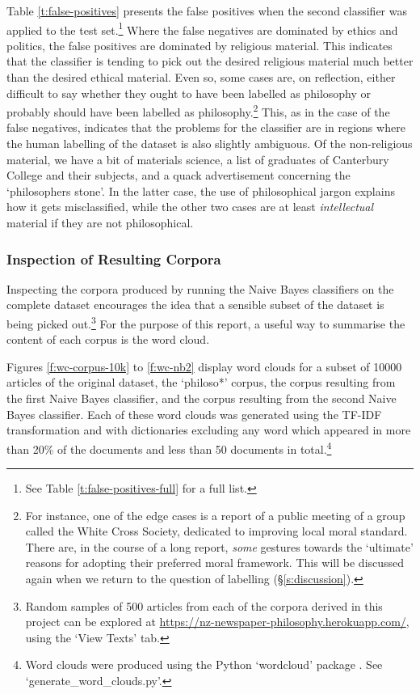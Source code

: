 \documentclass{article}
\begin{document}
Table \ref{t:false-positives} presents the false positives when the second classifier was applied to the test set.\footnote{See Table \ref{t:false-positives-full} for a full list.} Where the false negatives are dominated by ethics and politics, the false positives are dominated by religious material. This indicates that the classifier is tending to pick out the desired religious material much better than the desired ethical material. Even so, some cases are, on reflection, either difficult to say whether they ought to have been labelled as philosophy or probably should have been labelled as philosophy.\footnote{For instance, one of the edge cases is a report of a public meeting of a group called the White Cross Society, dedicated to improving local moral standard. There are, in the course of a long report, \emph{some} gestures towards the `ultimate' reasons for adopting their preferred moral framework. This will be discussed again when we return to the question of labelling (\S \ref{s:discussion}).} This, as in the case of the false negatives, indicates that the problems for the classifier are in regions where the human labelling of the dataset is also  slightly ambiguous. Of the non-religious material, we have a bit of materials science, a list of graduates of Canterbury College and their subjects, and a quack advertisement concerning the `philosophers stone'. In the latter case, the use of philosophical jargon explains how it gets misclassified, while the other two cases are at least \emph{intellectual} material if they are not philosophical.

\subsubsection{Inspection of Resulting Corpora}

Inspecting the corpora produced by running the Naive Bayes classifiers on the complete dataset encourages the idea that a sensible subset of the dataset is being picked out.\footnote{Random samples of 500 articles from each of the corpora derived in this project can be explored at \url{https://nz-newspaper-philosophy.herokuapp.com/}, using the `View Texts' tab.} For the purpose of this report, a useful way to summarise the content of each corpus is the word cloud.

Figures \ref{f:wc-corpus-10k} to \ref{f:wc-nb2} display word clouds for a subset of 10000 articles of the original dataset, the `philoso*' corpus, the corpus resulting from the first Naive Bayes classifier, and the corpus resulting from the second Naive Bayes classifier. Each of these word clouds was generated using the TF-IDF transformation and with dictionaries excluding any word which appeared in more than 20\% of the documents and less than 50 documents in total.\footnote{Word clouds were produced using the Python `wordcloud' package \cite{wordcloud}. See `generate\_\-word\_\-clouds.py'.}
\end{document}
